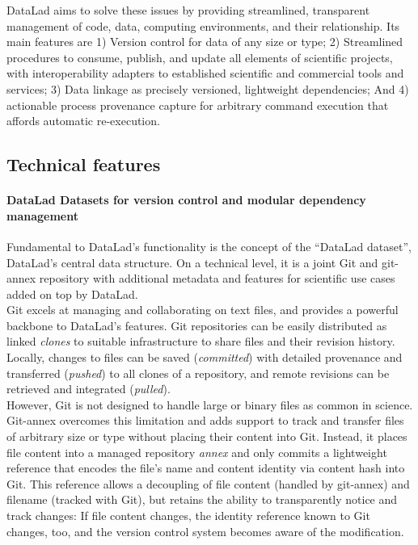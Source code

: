 {DataLad aims to solve these issues by providing streamlined, transparent management of code, data, computing environments, and their relationship.
Its main features are 1) Version control for data of any size or type; 2) Streamlined procedures to consume, publish, and update  all elements of scientific projects, with interoperability adapters to established scientific and commercial tools and services; 3) Data linkage as precisely versioned, lightweight dependencies; And 4) actionable process provenance capture for arbitrary command execution that affords automatic re-execution.

\subsection{Technical features}

\paragraph{DataLad Datasets for version control and modular dependency management}
Fundamental to DataLad's functionality is the concept of the ``DataLad dataset'', DataLad's central data structure.
On a technical level, it is a joint Git and git-annex repository with additional metadata and features for scientific use cases added on top by DataLad.\\
Git excels at managing and collaborating on text files, and provides a powerful backbone to DataLad's features.
Git repositories can be easily distributed as linked \textit{clones} to suitable infrastructure to share files and their revision history.
Locally, changes to files can be saved (\textit{committed}) with detailed provenance and transferred (\textit{pushed}) to all clones of a repository, and remote revisions can be retrieved and integrated (\textit{pulled}).\\
However, Git is not designed to handle large or binary files as common in science.
Git-annex overcomes this limitation and adds support to track and transfer files of arbitrary size or type without placing their content into Git.
Instead, it places file content into a managed repository \textit{annex} and only commits a lightweight reference that encodes the file's name and content identity via content hash into Git.
This reference allows a decoupling of file content (handled by git-annex) and filename (tracked with Git), but retains the ability to transparently notice and track changes: If file content changes, the identity reference known to Git changes, too, and the version control system becomes aware of the modification.
}
